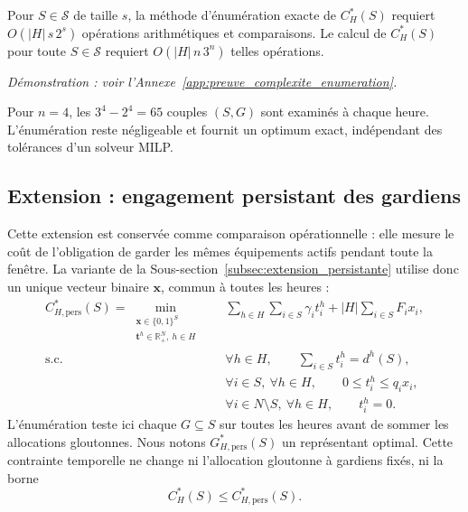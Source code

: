 \begin{proposition}
\label{prop:complexite_enumeration}
Pour \(S\in\mathcal S\) de taille \(s\), la méthode d'énumération exacte de \(C_H^*(S)\) requiert
\(O(|H|\,s\,2^s)\) opérations arithmétiques et comparaisons. Le calcul de
\(C_H^*(S)\) pour toute $S \in \mathcal S$ requiert
\(O(|H|\,n\,3^n)\) telles opérations.
\end{proposition}

\emph{Démonstration : voir l'Annexe~\ref{app:preuve_complexite_enumeration}.}

\begin{remarque}
Pour \(n=4\), les \(3^4-2^4=65\) couples \((S,G)\) sont examinés à chaque
heure. L'énumération reste négligeable et fournit un optimum exact,
indépendant des tolérances d'un solveur MILP.
\end{remarque}

\subsection{Extension : engagement persistant des gardiens}
\label{subsec:optimisation_fenetre}

Cette extension est conservée comme comparaison opérationnelle : elle mesure
le coût de l'obligation de garder les mêmes équipements actifs pendant toute
la fenêtre. La variante de la
Sous-section~\ref{subsec:extension_persistante} utilise donc un unique vecteur
binaire \(\mathbf x\), commun à toutes les heures :
\begin{equation}
\label{eq:milp_gardiens}
\begin{aligned}
C_{H,\mathrm{pers}}^*(S)
=
\min_{\substack{\mathbf x\in\{0,1\}^S\\
                \mathbf t^h\in\mathbb R_+^N,\ h\in H}}\quad
    & \sum_{h\in H}\sum_{i\in S}\gamma_i t_i^h
    + |H|\sum_{i\in S}F_i x_i,\\
\text{s.c.}\quad
    & \forall h\in H,\qquad
      \sum_{i\in S}t_i^h=d^h(S),\\
    & \forall i\in S,\ \forall h\in H,\qquad
      0\leqslant t_i^h\leqslant q_i x_i,\\
    & \forall i\in N\setminus S,\ \forall h\in H,\qquad
      t_i^h=0.
\end{aligned}
\end{equation}
L'énumération teste ici chaque \(G\subseteq S\) sur toutes les heures avant
de sommer les allocations gloutonnes. Nous notons
\(G_{H,\mathrm{pers}}^*(S)\) un représentant optimal. Cette contrainte
temporelle ne change ni l'allocation gloutonne à gardiens fixés, ni la borne
\[
    C_H^*(S)\leqslant C_{H,\mathrm{pers}}^*(S).
\]

